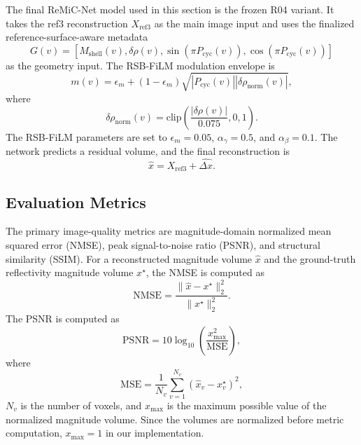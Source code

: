\documentclass[journal]{IEEEtran}
\begin{document}
The final ReMiC-Net model used in this section is the frozen R04 variant. It takes the ref3 reconstruction $X_{\mathrm{ref3}}$ as the main image input and uses the finalized reference-surface-aware metadata
\begin{equation}
G(v)=\left[
M_{\mathrm{shell}}(v),\delta\rho(v),
\sin(\pi P_{\mathrm{cyc}}(v)),
\cos(\pi P_{\mathrm{cyc}}(v))
\right]
\end{equation}
as the geometry input. The RSB-FiLM modulation envelope is
\begin{equation}
m(v)=\epsilon_m+(1-\epsilon_m)
\sqrt{
\left|P_{\mathrm{cyc}}(v)\right|
\left|\delta\rho_{\mathrm{norm}}(v)\right|
},
\label{eq:r04_envelope_results}
\end{equation}
where
\begin{equation}
\delta\rho_{\mathrm{norm}}(v)
=
\mathrm{clip}\left(\frac{|\delta\rho(v)|}{0.075},0,1\right).
\end{equation}
The RSB-FiLM parameters are set to $\epsilon_m=0.05$, $\alpha_\gamma=0.5$, and $\alpha_\beta=0.1$. The network predicts a residual volume, and the final reconstruction is
\begin{equation}
\hat{x}=X_{\mathrm{ref3}}+\widehat{\Delta x}.
\end{equation}

\subsection{Evaluation Metrics}
\label{subsec:evaluation_metrics}

The primary image-quality metrics are magnitude-domain normalized mean squared error (NMSE), peak signal-to-noise ratio (PSNR), and structural similarity (SSIM). For a reconstructed magnitude volume $\hat{x}$ and the ground-truth reflectivity magnitude volume $x^{\star}$, the NMSE is computed as
\begin{equation}
\mathrm{NMSE}
=
\frac{\|\hat{x}-x^{\star}\|_2^2}{\|x^{\star}\|_2^2}.
\end{equation}
The PSNR is computed as
\begin{equation}
\mathrm{PSNR}
=
10\log_{10}\left(\frac{x_{\max}^{2}}{\mathrm{MSE}}\right),
\label{eq:psnr_metric}
\end{equation}
where
\begin{equation}
\mathrm{MSE}
=
\frac{1}{N_v}\sum_{v=1}^{N_v}\left(\hat{x}_v-x^{\star}_v\right)^2,
\end{equation}
$N_v$ is the number of voxels, and $x_{\max}$ is the maximum possible value of the normalized magnitude volume. Since the volumes are normalized before metric computation, $x_{\max}=1$ in our implementation.
\end{document}
